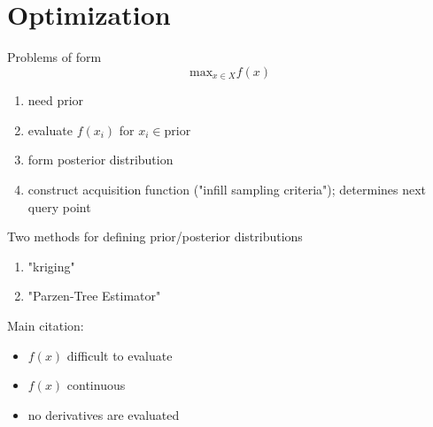 \documentclass{article}
\begin{document}
\section{Optimization}
\label{section:optimization}

Problems of form
\begin{equation}
    \text{max}_{x\in X} f(x)
\end{equation}

\begin{enumerate}
    \item need prior
    \item evaluate $f(x_i)$ for $x_i\in\text{prior}$
    \item form posterior distribution 
    \item construct acquisition function ("infill sampling criteria"); determines next query point
\end{enumerate}

Two methods for defining prior/posterior distributions
\begin{enumerate}
    \item "kriging"
    \item "Parzen-Tree Estimator"
\end{enumerate}

Main citation: \cite{Jones1998}
\begin{itemize}
    \item $f(x)$ difficult to evaluate
    \item $f(x)$ continuous
    \item no derivatives are evaluated
\end{itemize}
\end{document}

